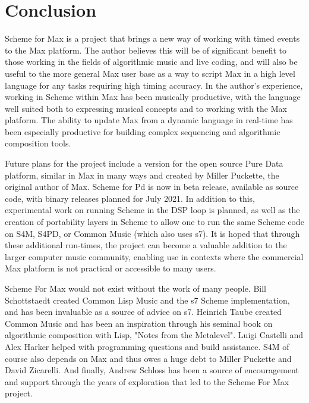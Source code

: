 \documentclass[acmsmall]{acmart}
\begin{document}
\section{Conclusion}
Scheme for Max is a project that brings a new way of working with
timed events to the Max platform. The author believes this will be
of significant benefit to those working in the fields of algorithmic
music and live coding, and will also be useful to the more general Max 
user base as a way to script Max in a high level language for any
tasks requiring high timing accuracy. In the author's experience, 
working in Scheme within Max has been musically productive, with the
language well suited both to expressing musical concepts and to working
with the Max platform. The ability to update Max from a dynamic language
in real-time has been especially productive for building complex sequencing
and algorithmic composition tools.

Future plans for the project include a version for the open source
Pure Data platform, similar in Max in many ways and created by Miller Puckette,
the original author of Max. Scheme for Pd is now in beta release, available
as source code, with binary releases planned for July 2021. In addition
to this, experimental work on running Scheme in the DSP loop is planned,
as well as the creation of portability layers in Scheme to allow one to run 
the same Scheme code on S4M, S4PD, or Common Music (which also uses s7).
It is hoped that through these additional run-times, the project can become 
a valuable addition to the larger computer music community, enabling
use in contexts where the commercial Max platform is not practical
or accessible to many users.


\begin{acks}
Scheme For Max would not exist without the work of many people. 
Bill Schottstaedt created Common Lisp Music and the s7 Scheme implementation,
and has been invaluable as a source of advice on s7. Heinrich Taube
created Common Music and has been an inspiration through his seminal book
on algorithmic composition with Lisp, "Notes from the Metalevel".
Luigi Castelli and Alex Harker helped with programming questions
and build assistance. 
S4M of course also depends on Max and thus owes a huge debt to 
Miller Puckette and David Zicarelli. And finally, Andrew Schloss has
been a source of encouragement and support through the years of 
exploration that led to the Scheme For Max project.

\end{acks}




\end{document}
